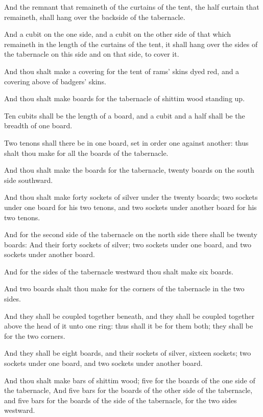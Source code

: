 \verse And the remnant that remaineth of the curtains of the tent, the half curtain that remaineth, shall hang over the backside of the tabernacle.

\verse And a cubit on the one side, and a cubit on the other side of that which remaineth in the length of the curtains of the tent, it shall hang over the sides of the tabernacle on this side and on that side, to cover it.

\verse And thou shalt make a covering for the tent of rams' skins dyed red, and a covering above of badgers' skins.

\verse And thou shalt make boards for the tabernacle of shittim wood standing up.

\verse Ten cubits shall be the length of a board, and a cubit and a half shall be the breadth of one board.

\verse Two tenons shall there be in one board, set in order one against another: thus shalt thou make for all the boards of the tabernacle.

\verse And thou shalt make the boards for the tabernacle, twenty boards on the south side southward.

\verse And thou shalt make forty sockets of silver under the twenty boards; two sockets under one board for his two tenons, and two sockets under another board for his two tenons.

\verse And for the second side of the tabernacle on the north side there shall be twenty boards: \verse And their forty sockets of silver; two sockets under one board, and two sockets under another board.

\verse And for the sides of the tabernacle westward thou shalt make six boards.

\verse And two boards shalt thou make for the corners of the tabernacle in the two sides.

\verse And they shall be coupled together beneath, and they shall be coupled together above the head of it unto one ring: thus shall it be for them both; they shall be for the two corners.

\verse And they shall be eight boards, and their sockets of silver, sixteen sockets; two sockets under one board, and two sockets under another board.

\verse And thou shalt make bars of shittim wood; five for the boards of the one side of the tabernacle, \verse And five bars for the boards of the other side of the tabernacle, and five bars for the boards of the side of the tabernacle, for the two sides westward.

